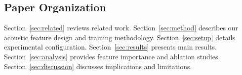 \subsection{Paper Organization}
Section~\ref{sec:related} reviews related work.
Section~\ref{sec:method} describes our acoustic feature design and training methodology.
Section~\ref{sec:setup} details experimental configuration.
Section~\ref{sec:results} presents main results.
Section~\ref{sec:analysis} provides feature importance and ablation studies.
Section~\ref{sec:discussion} discusses implications and limitations.
